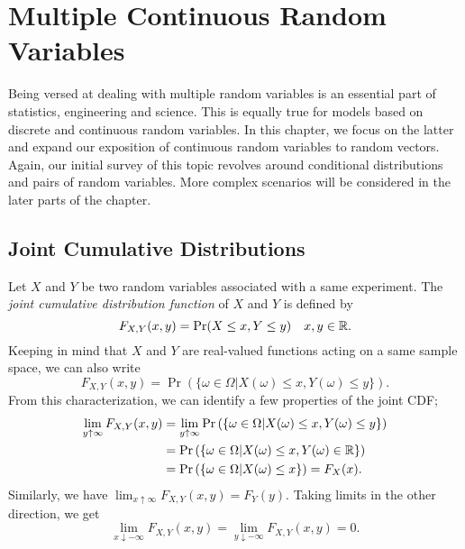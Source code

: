 \chapter[Continuous Random Vectors]{Multiple Continuous Random Variables}

Being versed at dealing with multiple random variables is an essential part of statistics, engineering and science.
This is equally true for models based on discrete and continuous random variables.
In this chapter, we focus on the latter and expand our exposition of continuous random variables to random vectors.
Again, our initial survey of this topic revolves around conditional distributions and pairs of random variables.
More complex scenarios will be considered in the later parts of the chapter.


\section{Joint Cumulative Distributions}

Let $X$ and $Y$ be two random variables associated with a same experiment.
The \emph{joint cumulative distribution function} of $X$ and $Y$ is defined by 
\begin{equation*}
F_{X,Y} (x, y) = \Pr (X \leq x, Y \leq y) \quad x, y \in \mathbb{R} .
\end{equation*}
Keeping in mind that $X$ and $Y$ are real-valued functions acting on a same sample space, we can also write
\begin{equation*}
F_{X,Y} (x, y) = \Pr \left( \{ \omega \in \Omega | X(\omega) \leq x, Y(\omega) \leq y \} \right) .
\end{equation*}
From this characterization, we can identify a few properties of the joint CDF;
\begin{equation*}
\begin{split}
\lim_{y \uparrow \infty} F_{X,Y} (x, y)
&= \lim_{y \uparrow \infty} \Pr \left( \{ \omega \in \Omega | X(\omega) \leq x, Y(\omega) \leq y \} \right) \\
&= \Pr \left( \{ \omega \in \Omega | X(\omega) \leq x, Y(\omega) \in \mathbb{R} \} \right) \\
&= \Pr \left( \{ \omega \in \Omega | X(\omega) \leq x \} \right)
= F_X (x) .
\end{split}
\end{equation*}
Similarly, we have $\lim_{x \uparrow \infty} F_{X,Y} (x,y) = F_Y (y)$.
Taking limits in the other direction, we get
\begin{equation*}
\lim_{x \downarrow -\infty} F_{X,Y} (x,y) 
= \lim_{y \downarrow -\infty} F_{X,Y} (x,y) = 0 .
\end{equation*}

